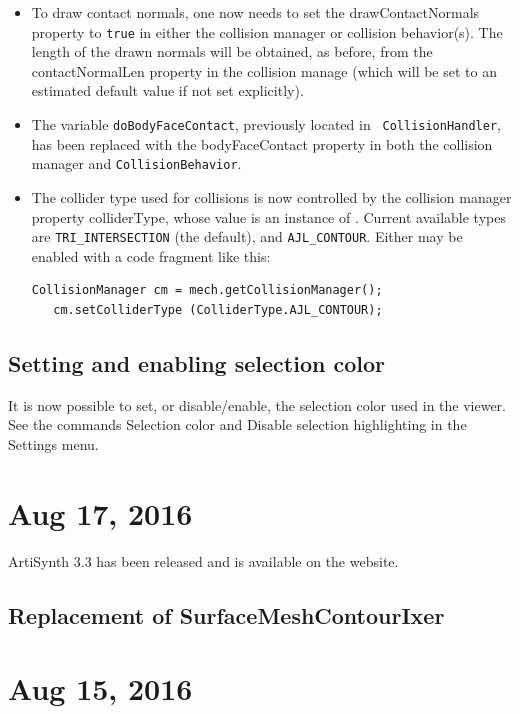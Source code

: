 \documentclass{article}
\begin{document}
\begin{itemize}
\item To draw contact normals, one now needs to set the {\sf
drawContactNormals} property to {\tt true} in either the collision
manager or collision behavior(s). The length of the drawn normals will
be obtained, as before, from the {\sf contactNormalLen} property in
the collision manage (which will be set to an estimated default value
if not set explicitly).

\item The variable {\tt doBodyFaceContact}, previously located in {\tt
CollisionHandler}, has been replaced with the {\sf bodyFaceContact}
property in both the collision manager and {\tt CollisionBehavior}.

\item The collider type used for collisions is now controlled by the
collision manager property {\sf colliderType}, whose value is an
instance of
.
Current available types are {\tt TRI\_INTERSECTION} (the default), and
{\tt AJL\_CONTOUR}. Either may be enabled with a code fragment like
this:
%
\begin{lstlisting}[]
   CollisionManager cm = mech.getCollisionManager();
   cm.setColliderType (ColliderType.AJL_CONTOUR);
\end{lstlisting}
%

\end{itemize}

\subsection*{Setting and enabling selection color}

It is now possible to set, or disable/enable, the selection color used
in the viewer. See the commands {\sf Selection color} and {\sf Disable
selection highlighting} in the {\sf Settings} menu.

\section*{Aug 17, 2016}

ArtiSynth 3.3 has been released and is available on the website.

\subsection*{Replacement of SurfaceMeshContourIxer}

\section*{Aug 15, 2016}
\end{document}
